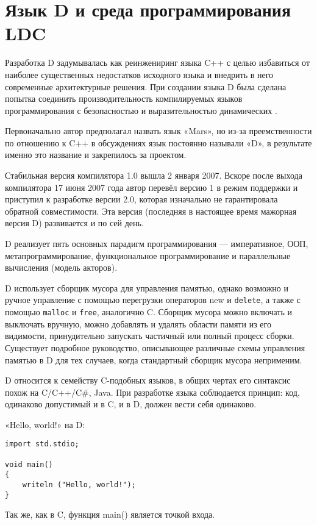 \documentclass{studrep}
\begin{document}
\chapter{Язык D и среда программирования LDC}

Разработка D задумывалась как реинжениринг языка C++ с целью избавиться от наиболее существенных недостатков исходного языка и внедрить в него современные архитектурные решения. При создании языка D была сделана попытка соединить производительность компилируемых языков программирования с безопасностью и выразительностью динамических \cite{wikipedia}.

Первоначально автор предполагал назвать язык «Mars», но из-за преемственности по отношению к C++ в обсуждениях язык постоянно называли «D», в результате именно это название и закрепилось за проектом.

Стабильная версия компилятора 1.0 вышла 2 января 2007. Вскоре после выхода компилятора 17 июня 2007 года автор перевёл версию 1 в режим поддержки и приступил к разработке версии 2.0, которая изначально не гарантировала обратной совместимости. Эта версия (последняя в настоящее время мажорная версия D) развивается и по сей день.

D реализует пять основных парадигм программирования — императивное, ООП, метапрограммирование, функциональное программирование и параллельные вычисления (модель акторов).

D использует сборщик мусора для управления памятью, однако возможно и ручное управление с помощью перегрузки операторов new и \texttt{delete}, а также с помощью \texttt{malloc} и \texttt{free}, аналогично C. Сборщик мусора можно включать и выключать вручную, можно добавлять и удалять области памяти из его видимости, принудительно запускать частичный или полный процесс сборки. Существует подробное руководство, описывающее различные схемы управления памятью в D для тех случаев, когда стандартный сборщик мусора неприменим.

D относится к семейству C-подобных языков, в общих чертах его синтаксис похож на C/C++/C\#, Java. При разработке языка соблюдается принцип: код, одинаково допустимый и в C, и в D, должен вести себя одинаково.

«Hello, world!» на D:
\begin{verbatim}
import std.stdio;

void main()
{
    writeln ("Hello, world!");
}
\end{verbatim}
Так же, как в C, функция main() является точкой входа.
\end{document}
